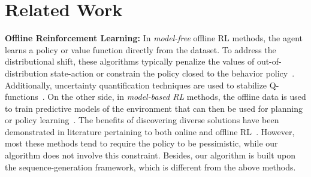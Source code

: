 \section{Related Work}
\label{sec:related_work}
\textbf{Offline Reinforcement Learning:}
In \emph{model-free} offline RL methods, the agent learns a policy or value function directly from the dataset. To address the distributional shift, these algorithms typically penalize the values of out-of-distribution state-action or constrain the policy closed to the behavior policy~\cite{r:17,r:21,r:22,r:82,r:67}. Additionally, uncertainty quantification techniques are used to stabilize Q-functions~\cite{r:17,r:82,r:80,r:81}. On the other side, in \emph{model-based RL} methods, the offline data is used to train predictive models of the environment that can then be used for planning or policy learning~\cite{r:92,r:24}. 
The benefits of discovering diverse solutions have been demonstrated in literature pertaining to both online and offline RL~\cite{r:140,r:141,r:142}.
However, most these methods tend to require the policy to be pessimistic, while our algorithm does not involve this constraint. Besides, our algorithm is built upon the sequence-generation framework, which is different from the above methods.

